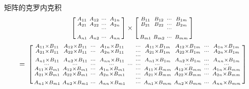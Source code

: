 \documentclass{amsc}          %
\numberwithin{equation}{section} %
\begin{document}
\begin{definition}
矩阵的克罗内克积
\\
   $$\begin{bmatrix}\begin{smallmatrix}
  A_{11}& A_{12}& \cdots&A_{1n}\\
  A_{21}& A_{22}& \cdots&A_{2n}\\
  & & \cdots&\\&\\
  A_{n1}& A_{n2}& \cdots&A_{nn}\\
 \end{smallmatrix}\end{bmatrix}
 \times
 \begin{bmatrix}\begin{smallmatrix}
  B_{11}& B_{12}& \cdots&B_{1m}\\
  B_{21}& B_{22}& \cdots&B_{2m}\\
  & & \cdots&\\&\\
  B_{m1}& B_{m2}& \cdots&B_{mm}\\
 \end{smallmatrix}\end{bmatrix}\\$$
 $$=\\
 \begin{bmatrix}\begin{smallmatrix}
  A_{11} \times B_{11}& A_{12} \times B_{11}& \cdots&A_{1n} \times B_{11}
  & & \cdots&
  A_{11} \times B_{1m}& A_{12} \times B_{1m}& \cdots&A_{1n} \times B_{1m}\\
  A_{21} \times B_{11}& A_{22} \times B_{11}& \cdots&A_{2n} \times B_{11}
  & & \cdots&
  A_{21} \times B_{1m}& A_{22} \times B_{1m}& \cdots&A_{2n} \times B_{1m}\\
  & & & & &\cdots& &\\
  A_{n1} \times B_{11}& A_{n2} \times B_{11}& \cdots&A_{nn} \times B_{11}
  & & \cdots&
  A_{n1} \times B_{1m}& A_{n2} \times B_{1m}& \cdots&A_{nn} \times B_{1m}\\
  \cdots &\cdots &\cdots &\cdots &\cdots  &\cdots  &\cdots &\cdots  &\cdots &\cdots \\
  A_{11} \times B_{m1}& A_{12} \times B_{m1}& \cdots&A_{1n} \times B_{m1}
  & & \cdots&
  A_{11} \times B_{mm}& A_{12} \times B_{mm}& \cdots&A_{1n} \times B_{mm}\\
  A_{21} \times B_{m1}& A_{22} \times B_{m1}& \cdots&A_{2n} \times B_{m1}
  & & \cdots&
  A_{21} \times B_{mm}& A_{22} \times B_{mm}& \cdots&A_{2n} \times B_{mm}\\
  & & & & &\cdots& &\\
  A_{n1} \times B_{m1}& A_{n2} \times B_{m1}& \cdots&A_{nn} \times B_{m1}
  & & \cdots&
  A_{n1} \times B_{mm}& A_{n2} \times B_{mm}& \cdots&A_{nn} \times B_{mm}\\
  \end{smallmatrix}\end{bmatrix}$$
\end{definition}
\end{document}
